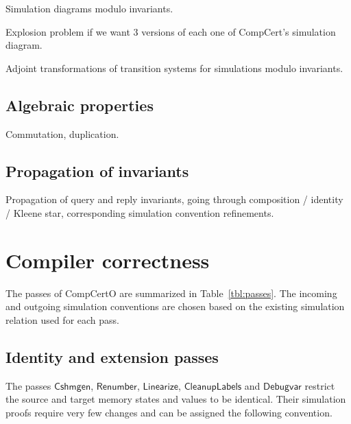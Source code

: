 \documentclass[acmsmall,authordraft]{acmart}
\newcommand{\kw}[1]{\ensuremath{ \mathsf{#1} }}
\begin{document}
Simulation diagrams modulo invariants.

Explosion problem if we want 3 versions of
each one of CompCert's simulation diagram.

Adjoint transformations of transition systems
for simulations modulo invariants.

\subsection{Algebraic properties}

Commutation, duplication.

\subsection{Propagation of invariants}

Propagation of query and reply invariants,
going through composition / identity / Kleene star,
corresponding simulation convention refinements.


\section{Compiler correctness} \label{sec:passes} %

The passes of CompCertO are summarized in Table~\ref{tbl:passes}.
The incoming and outgoing simulation conventions
are chosen based on the existing simulation relation
used for each pass.

\subsection{Identity and extension passes} \label{sec:pass:id} %

The passes \kw{Cshmgen}, \kw{Renumber}, \kw{Linearize},
\kw{CleanupLabels} and \kw{Debugvar}
restrict the source and target
memory states and values to be identical.
Their simulation proofs require very few changes
and can be assigned the following convention.
\end{document}
